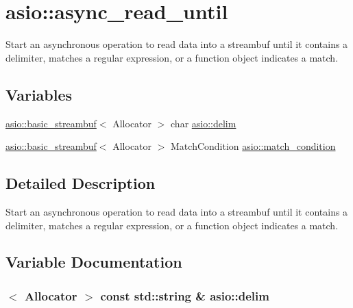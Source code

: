 \hypertarget{group__async__read__until}{}\section{asio\+:\+:async\+\_\+read\+\_\+until}
\label{group__async__read__until}


Start an asynchronous operation to read data into a streambuf until it contains a delimiter, matches a regular expression, or a function object indicates a match.  


\subsection*{Variables}
\begin{DoxyCompactItemize}
\item 
\hyperlink{classasio_1_1basic__streambuf}{asio\+::basic\+\_\+streambuf}$<$ Allocator $>$ char \hyperlink{group__async__read__until_gafbf62a75ad736aff941c1f70d4b3c223}{asio\+::delim}
\item 
\hyperlink{classasio_1_1basic__streambuf}{asio\+::basic\+\_\+streambuf}$<$ Allocator $>$ Match\+Condition \hyperlink{group__async__read__until_ga950b81fb954e4a0f01e13a57e15721b4}{asio\+::match\+\_\+condition}
\end{DoxyCompactItemize}


\subsection{Detailed Description}
Start an asynchronous operation to read data into a streambuf until it contains a delimiter, matches a regular expression, or a function object indicates a match. 



\subsection{Variable Documentation}
\hypertarget{group__async__read__until_gafbf62a75ad736aff941c1f70d4b3c223}{}
\subsubsection[{delim}]{$<$ Allocator $>$ const std\+::string \& asio\+::delim}\label{group__async__read__until_gafbf62a75ad736aff941c1f70d4b3c223}



